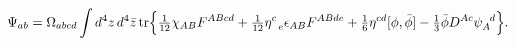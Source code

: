 \begin{equation*}
\Psi_{ab} = \Omega_{abcd} \int d^4z\, d^4\bar{z}\, {\rm tr} \Bigr\{
\hbox{$\frac{1}{12}$} \chi_{AB} F^{AB cd} +
\hbox{$\frac{1}{12}$} \eta^c_{\!~~e} \epsilon_{AB} F^{AB de} +
\hbox{$\frac{1}{6}$} \eta^{cd} [ \phi, \bar{\phi} ] -
\hbox{$\frac{1}{3}$} \bar{\phi} D^{A c} \psi_A^{\!~~d} \Bigr\}.
\end{equation*}

